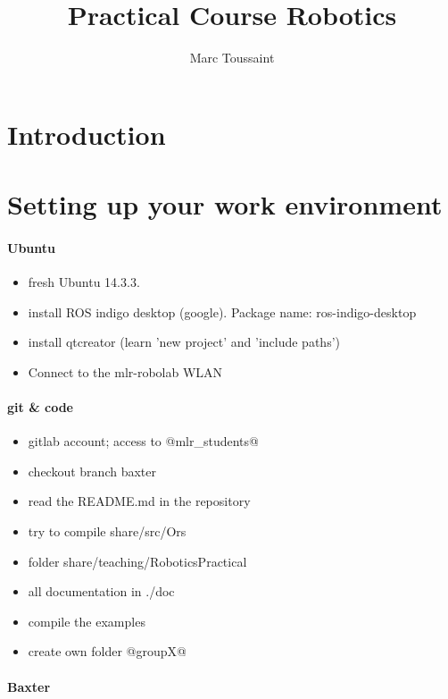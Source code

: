 \documentclass[10pt,fleqn,twoside]{article}
\title{Practical Course Robotics}
\author{Marc Toussaint}
\begin{document}
\maketitle

{\small\tableofcontents }

\section{Introduction}

\section{Setting up your work environment}

\paragraph{Ubuntu}
\begin{itemize}
\item fresh Ubuntu 14.3.3.
\item install ROS indigo desktop (google). Package name:
  ros-indigo-desktop
\item install qtcreator (learn 'new project' and 'include paths')
\item Connect to the mlr-robolab WLAN
\end{itemize}

\paragraph{git \& code}
\begin{itemize}
\item gitlab account; access to @mlr_students@
\item checkout branch baxter
\item read the README.md in the repository
\item try to compile share/src/Ors
\item folder share/teaching/RoboticsPractical
\item all documentation in ./doc
\item compile the examples
\item create own folder @groupX@
\end{itemize}

\paragraph{Baxter}
\end{document}
